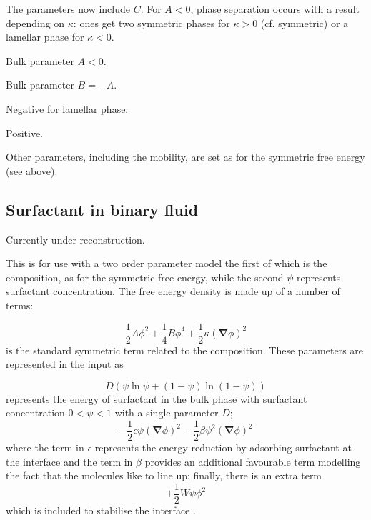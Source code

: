 The parameters now include $C$. For $A<0$, phase separation occurs
with a result depending on $\kappa$: ones get two symmetric phases
for $\kappa >0$ (cf. symmetric) or a lamellar phase for
$\kappa < 0$.

 Bulk parameter $A < 0$.

 Bulk parameter $B = -A$.

 Negative for lamellar phase.

 Positive.

Other parameters, including the mobility, are set as for the
symmetric free energy (see above).


\subsection{Surfactant in binary fluid}


Currently under reconstruction.

This is for use with a two order parameter model the first of
which is the composition, as for the symmetric free energy,
while the second $\psi$ represents surfactant concentration.
The free energy density is made up of a number of terms:

\begin{equation}
{\textstyle \frac{1}{2}}A\phi^2
+ {\textstyle \frac{1}{4}}B\phi^4
+ {\textstyle \frac{1}{2}}\kappa (\mathbf{\nabla}\phi)^2
\end{equation}
is the standard symmetric term related to the composition.
These parameters are represented in the input as


\begin{equation}
D \left(\psi \ln\psi + (1 - \psi) \ln(1-\psi)\right)
\end{equation}
represents the energy of surfactant in the bulk phase with surfactant
concentration $0 < \psi < 1$ with a single parameter $D$;
\begin{equation}
-{\textstyle \frac{1}{2}} \epsilon \psi (\mathbf{\nabla} \phi)^2
-{\textstyle \frac{1}{2}} \beta \psi^2  (\mathbf{\nabla} \phi)^2
\end{equation}
where the term in $\epsilon$ represents the energy reduction by
adsorbing surfactant at the interface and the term in $\beta$
provides an additional favourable term modelling the fact that
the molecules like to line up; finally, there is an extra term
\begin{equation}
+{\textstyle \frac{1}{2}} W \psi \phi^2
\end{equation}
which is included to stabilise the interface \cite{theissengompper}.

